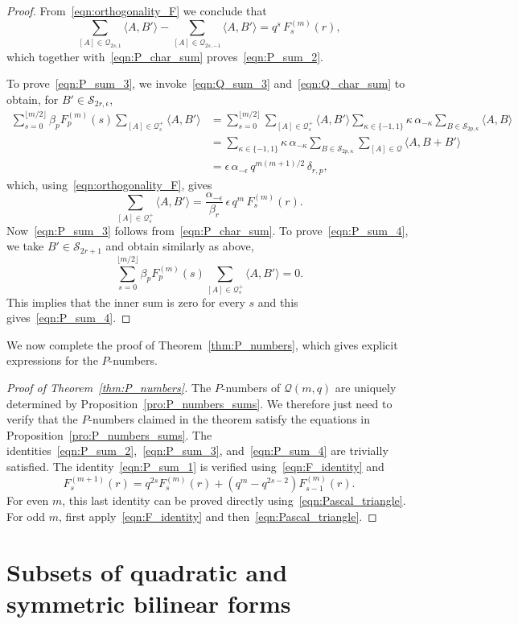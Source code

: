 \documentclass[10pt]{article}
\theoremstyle{definition}
\newcommand{\Q}{\mathscr{Q}}
\renewcommand{\S}{\mathscr{S}}
\newcommand{\e}{\epsilon}
\newcommand{\floor}[1]{\lfloor#1\rfloor}
\newcommand{\ang}[1]{\langle#1\rangle}
\begin{document}
\begin{proof}
From~\eqref{eqn:orthogonality_F} we conclude that
\[
\sum_{[A]\in\Q_{2s,1}}\ang{A,B'}-\sum_{[A]\in\Q_{2s,-1}}\ang{A,B'}=q^s\,F^{(m)}_s(r),
\]
which together with~\eqref{eqn:P_char_sum} proves~\eqref{eqn:P_sum_2}.
\par
To prove~\eqref{eqn:P_sum_3}, we invoke~\eqref{eqn:Q_sum_3} and~\eqref{eqn:Q_char_sum} to obtain, for $B'\in\S_{2r,\e}$,
\begin{align*}
\sum_{s=0}^{\floor{m/2}}\beta_pF^{(m)}_p(s)\sum_{[A]\in\Q_s^+}\ang{A,B'}&=\sum_{s=0}^{\floor{m/2}}\sum_{[A]\in\Q_s^+}\ang{A,B'}\sum_{\kappa\in\{-1,1\}}\kappa\,\alpha_{-\kappa}\!\sum_{B\in\S_{2p,\kappa}}\ang{A,B}\\%
&=\sum_{\kappa\in\{-1,1\}}\kappa\,\alpha_{-\kappa}\sum_{B\in\S_{2p,\kappa}}\sum_{[A]\in\Q}\ang{A,B+B'}\\%
&=\e\,\alpha_{-\e}\,q^{m(m+1)/2}\,\delta_{r,p},
\end{align*}
which, using~\eqref{eqn:orthogonality_F}, gives
\[
\sum_{[A]\in\Q_s^+}\ang{A,B'}=\frac{\alpha_{-\e}}{\beta_r}\,\e\,q^m\,F^{(m)}_s(r).
\]
Now~\eqref{eqn:P_sum_3} follows from~\eqref{eqn:P_char_sum}. 
To prove~\eqref{eqn:P_sum_4}, we take $B'\in\S_{2r+1}$ and obtain similarly as above,
\[
\sum_{s=0}^{\floor{m/2}}\beta_pF^{(m)}_p(s)\sum_{[A]\in\Q_s^+}\ang{A,B'}=0.
\]
This implies that the inner sum is zero for every $s$ and this gives~\eqref{eqn:P_sum_4}.
\end{proof}
\par
We now complete the proof of Theorem~\ref{thm:P_numbers}, which gives explicit expressions for the $P$-numbers.
\begin{proof}[Proof of Theorem~\ref{thm:P_numbers}]
The $P$-numbers of $\Q(m,q)$ are uniquely determined by Proposition~\ref{pro:P_numbers_sums}. We therefore just need to verify that the $P$-numbers claimed in the theorem satisfy the equations in Proposition~\ref{pro:P_numbers_sums}. The identities~\eqref{eqn:P_sum_2},~\eqref{eqn:P_sum_3}, and~\eqref{eqn:P_sum_4} are trivially satisfied. The identity~\eqref{eqn:P_sum_1} is verified using~\eqref{eqn:F_identity} and
\[
%
F^{(m+1)}_s(r)=q^{2s}F^{(m)}_s(r)+(q^m-q^{2s-2})F^{(m)}_{s-1}(r).
\]
For even $m$, this last identity can be proved directly using~\eqref{eqn:Pascal_triangle}. For odd $m$, first apply~\eqref{eqn:F_identity} and then~\eqref{eqn:Pascal_triangle}.
\end{proof}

%

\section{Subsets of quadratic and symmetric bilinear forms}
\end{document}
